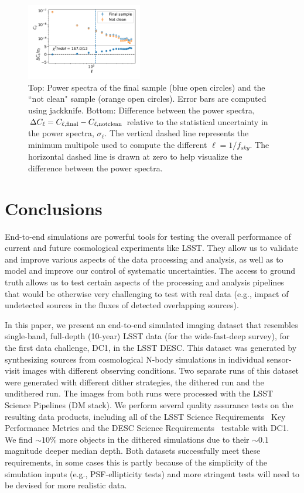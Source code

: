 \documentclass[a4paper,fleqn,usenatbib]{mnras}
\begin{document}
\begin{figure}
\centering
\includegraphics[width=0.45\textwidth]{figures/clean_no_clean}
\caption{Top: Power spectra of the final sample (blue open circles) and the ``not clean" sample (orange open circles). Error bars are computed using jackknife. Bottom: Difference between the power spectra, $\Delta C_{\ell} = C_{\ell, \rm{final}} - C_{\ell, \rm{not clean}}$ relative to the statistical uncertainty in the power spectra, $\sigma_{\ell}$. The vertical dashed line represents the minimum multipole used to compute the different $\ell = 1/f_{sky}$. The horizontal dashed line is drawn at zero to help visualize the difference between the power spectra.}
\label{fig:comparison_clean}
\end{figure}

\section{Conclusions}
\label{sec:conclusions}

End-to-end simulations are powerful tools for testing the overall performance of current and future cosmological experiments like LSST. They allow us to validate and improve various aspects of the data processing and analysis, as well as to model and improve our control of systematic uncertainties. The access to ground truth allows us to test certain aspects of the processing and analysis pipelines that would be otherwise very challenging to test with real data (e.g., impact of undetected sources in the fluxes of detected overlapping sources). 

In this paper, we present an end-to-end simulated imaging dataset that resembles single-band, full-depth (10-year) LSST data (for the wide-fast-deep survey), for the first data challenge, DC1, in the LSST DESC. This dataset was generated by synthesizing sources from cosmological N-body simulations in individual sensor-visit images with different observing conditions. Two separate runs of this dataset were generated with different dither strategies, the dithered run and the undithered run. The images from both runs were processed with the LSST Science Pipelines (DM stack). We perform several quality assurance tests on the resulting data products, including all of the LSST Science Requirements~\citep{LPM-17} Key Performance Metrics and the DESC Science Requirements~\citep{2018arXiv180901669T} testable with DC1. We find $\sim10$\% more objects in the dithered simulations due to their $\sim0.1$ magnitude deeper median depth. Both datasets successfully meet these requirements, in some cases this is partly because of the simplicity of the simulation inputs (e.g., PSF-ellipticity tests) and more stringent tests will need to be devised for more realistic data.
\end{document}
